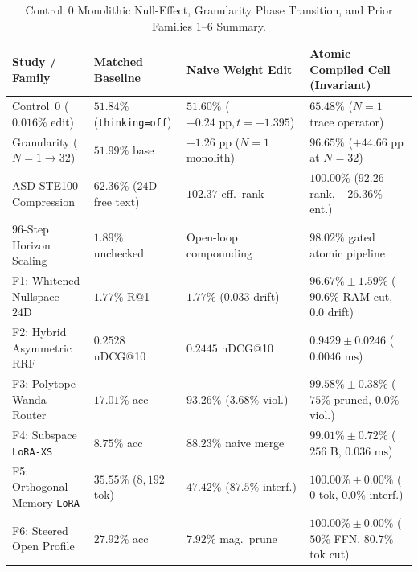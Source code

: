 \documentclass[11pt,a4paper]{article}
\begin{document}
\begin{table}[htbp]
\centering
\caption{Control~0 Monolithic Null-Effect, Granularity Phase Transition, and Prior Families 1--6 Summary.}
\label{tab:prior_families}
\small
\begin{tabular}{@{}llll@{}}
\toprule
\textbf{Study / Family} & \textbf{Matched Baseline} & \textbf{Naive Weight Edit} & \textbf{Atomic Compiled Cell (Invariant)} \\
\midrule
Control~0 ($0.016\%$ edit) & $51.84\%$ (\texttt{thinking=off}) & $51.60\%$ ($-0.24\text{ pp}, t=-1.395$) & $65.48\%$ ($N=1$ trace operator) \\
Granularity ($N=1 \to 32$) & $51.99\%$ base & $-1.26\text{ pp}$ ($N=1$ monolith) & $96.65\%$ ($+44.66\text{ pp}$ at $N=32$) \\
ASD-STE100 Compression & $62.36\%$ ($24\text{D}$ free text) & $102.37$ eff.\ rank & $100.00\%$ ($92.26$ rank, $-26.36\%$ ent.) \\
$96$-Step Horizon Scaling & $1.89\%$ unchecked & Open-loop compounding & $98.02\%$ gated atomic pipeline \\
\midrule
F1: Whitened Nullspace $24\text{D}$ & $1.77\%$ R@1 & $1.77\%$ ($0.033$ drift) & $96.67\% \pm 1.59\%$ ($90.6\%$ RAM cut, $0.0$ drift) \\
F2: Hybrid Asymmetric RRF & $0.2528$ nDCG@10 & $0.2445$ nDCG@10 & $0.9429 \pm 0.0246$ ($0.0046\text{ ms}$) \\
F3: Polytope Wanda Router & $17.01\%$ acc & $93.26\%$ ($3.68\%$ viol.) & $99.58\% \pm 0.38\%$ ($75\%$ pruned, $0.0\%$ viol.) \\
F4: Subspace \texttt{LoRA-XS} & $8.75\%$ acc & $88.23\%$ naive merge & $99.01\% \pm 0.72\%$ ($256\text{ B}$, $0.036\text{ ms}$) \\
F5: Orthogonal Memory \texttt{LoRA} & $35.55\%$ ($8{,}192$ tok) & $47.42\%$ ($87.5\%$ interf.) & $100.00\% \pm 0.00\%$ ($0$ tok, $0.0\%$ interf.) \\
F6: Steered Open Profile & $27.92\%$ acc & $7.92\%$ mag.\ prune & $100.00\% \pm 0.00\%$ ($50\%$ FFN, $80.7\%$ tok cut) \\
\bottomrule
\end{tabular}
\end{table}
\end{document}
